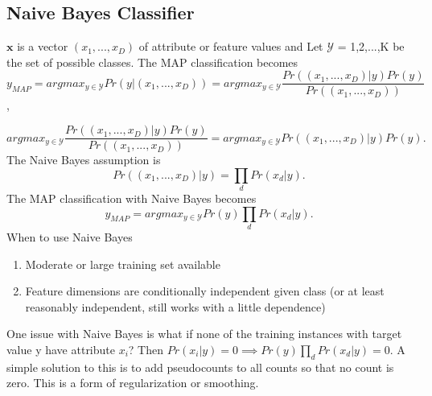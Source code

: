 \documentclass[12pt]{article}
\numberwithin{equation}{section}
\begin{document}
\subsection{Naive Bayes Classifier}
$\bm{x}$ is a vector $(x_1, . . . , x_D)$ of attribute or feature values and Let $\mathcal{Y}$ = {1,2,...,K} be the set of possible classes. The MAP classification becomes
\begin{equation}
y_{MAP} = arg max_{y \in \mathcal{Y} } Pr(y | (x_1, . . . , x_D) ) = arg max_{y \in \mathcal{Y} } \frac{Pr((x_1, . . . , x_D) | y ) Pr( y )   }{Pr((x_1, . . . , x_D) ) } \end{equation},

\begin{equation}
arg max_{y \in \mathcal{Y} } \frac{Pr((x_1, . . . , x_D) | y ) Pr( y )   }{Pr((x_1, . . . , x_D) ) } =   arg max_{y \in \mathcal{Y} } Pr((x_1, . . . , x_D) | y ) Pr( y ).
\end{equation}
The Naive Bayes assumption is 
\begin{equation}
Pr((x_1, . . . , x_D) | y )  = \prod_d Pr(x_d | y).
\end{equation}
The MAP classification with Naive Bayes becomes
\begin{equation}
y_{MAP} = arg max_{y \in \mathcal{Y} } Pr(y )  \prod_d Pr(x_d | y).
\end{equation}
When to use Naive Bayes

\begin{enumerate}
\item Moderate or large training set available
\item Feature dimensions are conditionally independent given class (or at least reasonably independent, still works with a little dependence)
\end{enumerate}
One issue with Naive Bayes is what if none of the training instances with target value y have attribute $x_i$? Then $Pr(x_i|y ) = 0 \implies Pr(y )\prod_d Pr(x_d | y) = 0 $. A simple solution to this is to add pseudocounts to all counts so that no count is zero. This is a form of regularization or smoothing.
\end{document}
